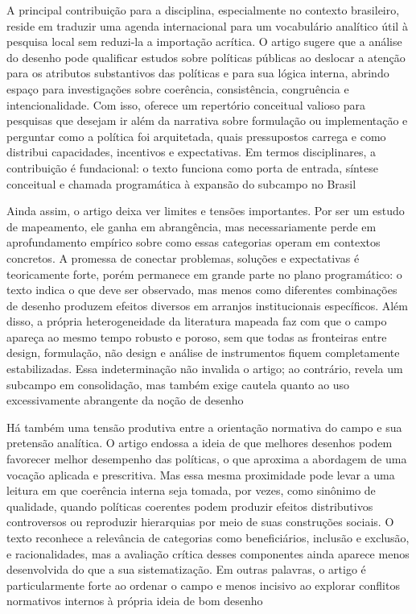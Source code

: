 \documentclass[12pt,a4paper]{article}
\begin{document}
A principal contribuição para a disciplina, especialmente no contexto brasileiro, reside em traduzir uma agenda internacional para um vocabulário analítico útil à pesquisa local sem reduzi-la a importação acrítica. O artigo sugere que a análise do desenho pode qualificar estudos sobre políticas públicas ao deslocar a atenção para os atributos substantivos das políticas e para sua lógica interna, abrindo espaço para investigações sobre coerência, consistência, congruência e intencionalidade. Com isso, oferece um repertório conceitual valioso para pesquisas que desejam ir além da narrativa sobre formulação ou implementação e perguntar como a política foi arquitetada, quais pressupostos carrega e como distribui capacidades, incentivos e expectativas. Em termos disciplinares, a contribuição é fundacional: o texto funciona como porta de entrada, síntese conceitual e chamada programática à expansão do subcampo no Brasil \parencite{lima2021_conectando_problemas}

Ainda assim, o artigo deixa ver limites e tensões importantes. Por ser um estudo de mapeamento, ele ganha em abrangência, mas necessariamente perde em aprofundamento empírico sobre como essas categorias operam em contextos concretos. A promessa de conectar problemas, soluções e expectativas é teoricamente forte, porém permanece em grande parte no plano programático: o texto indica o que deve ser observado, mas menos como diferentes combinações de desenho produzem efeitos diversos em arranjos institucionais específicos. Além disso, a própria heterogeneidade da literatura mapeada faz com que o campo apareça ao mesmo tempo robusto e poroso, sem que todas as fronteiras entre design, formulação, não design e análise de instrumentos fiquem completamente estabilizadas. Essa indeterminação não invalida o artigo; ao contrário, revela um subcampo em consolidação, mas também exige cautela quanto ao uso excessivamente abrangente da noção de desenho \parencite{lima2021_conectando_problemas}

Há também uma tensão produtiva entre a orientação normativa do campo e sua pretensão analítica. O artigo endossa a ideia de que melhores desenhos podem favorecer melhor desempenho das políticas, o que aproxima a abordagem de uma vocação aplicada e prescritiva. Mas essa mesma proximidade pode levar a uma leitura em que coerência interna seja tomada, por vezes, como sinônimo de qualidade, quando políticas coerentes podem produzir efeitos distributivos controversos ou reproduzir hierarquias por meio de suas construções sociais. O texto reconhece a relevância de categorias como beneficiários, inclusão e exclusão, e racionalidades, mas a avaliação crítica desses componentes ainda aparece menos desenvolvida do que a sua sistematização. Em outras palavras, o artigo é particularmente forte ao ordenar o campo e menos incisivo ao explorar conflitos normativos internos à própria ideia de bom desenho \parencite{lima2021_conectando_problemas}
\end{document}
